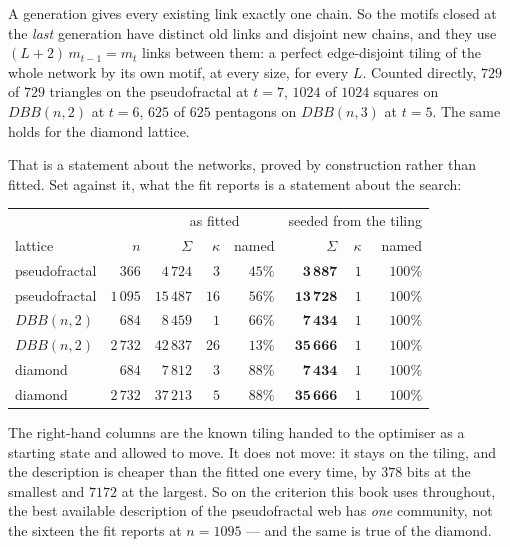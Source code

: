 A generation gives every existing link exactly one chain. So the motifs closed at
the \emph{last} generation have distinct old links and disjoint new chains, and
they use $(L+2)\,m_{t-1}=m_t$ links between them: a perfect edge-disjoint tiling
of the whole network by its own motif, at every size, for every $L$. Counted
directly, $729$ of $729$ triangles on the pseudofractal at $t=7$, $1024$ of
$1024$ squares on $DBB(n,2)$ at $t=6$, $625$ of $625$ pentagons on $DBB(n,3)$ at
$t=5$. The same holds for the diamond lattice.

That is a statement about the networks, proved by construction rather than
fitted. Set against it, what the fit reports is a statement about the search:

\begin{center}
\footnotesize\setlength{\tabcolsep}{4pt}
\begin{tabular}{lrrrr@{\hskip 10pt}rrr}
\hline
 & & \multicolumn{3}{c}{as fitted} & \multicolumn{3}{c}{seeded from the tiling}\\
lattice & $n$ & $\Sigma$ & $\kappa$ & named & $\Sigma$ & $\kappa$ & named\\
\hline
pseudofractal & $366$   & $4\,724$  & $3$  & $45\%$ & $\mathbf{3\,887}$  & $1$ & $100\%$\\
pseudofractal & $1\,095$ & $15\,487$ & $16$ & $56\%$ & $\mathbf{13\,728}$ & $1$ & $100\%$\\
$DBB(n,2)$    & $684$   & $8\,459$  & $1$  & $66\%$ & $\mathbf{7\,434}$  & $1$ & $100\%$\\
$DBB(n,2)$    & $2\,732$ & $42\,837$ & $26$ & $13\%$ & $\mathbf{35\,666}$ & $1$ & $100\%$\\
diamond       & $684$   & $7\,812$  & $3$  & $88\%$ & $\mathbf{7\,434}$  & $1$ & $100\%$\\
diamond       & $2\,732$ & $37\,213$ & $5$  & $88\%$ & $\mathbf{35\,666}$ & $1$ & $100\%$\\
\hline
\end{tabular}
\end{center}

\noindent The right-hand columns are the known tiling handed to the optimiser as
a starting state and allowed to move. It does not move: it stays on the tiling,
and the description is cheaper than the fitted one every time, by $378$ bits at
the smallest and $7172$ at the largest. So on the criterion this book uses
throughout, the best available description of the pseudofractal web has
\emph{one} community, not the sixteen the fit reports at $n=1095$ --- and the same
is true of the diamond.

